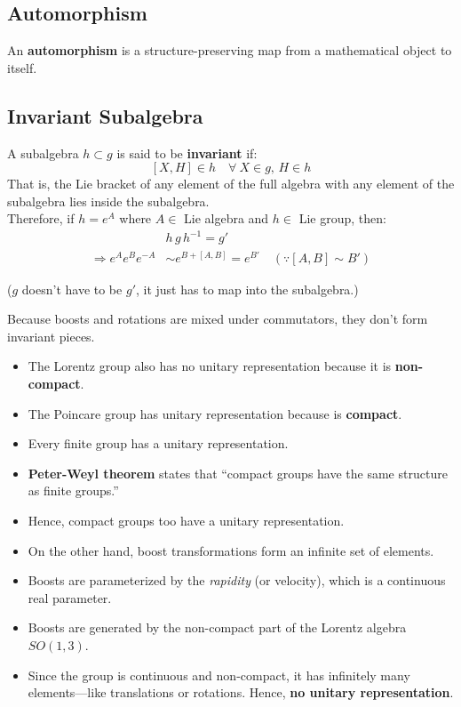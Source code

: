 \documentclass[14pt]{article} %
\begin{document}
\subsection*{Automorphism}
An \textbf{automorphism} is a structure-preserving map from a mathematical object to itself.

\subsection*{Invariant Subalgebra}
A subalgebra $h \subset g$ is said to be \textbf{invariant} if:
\[
[X,H] \in h \quad \forall~ X \in g, \, H \in h
\]
That is, the Lie bracket of any element of the full algebra with any element of the subalgebra lies inside the subalgebra.\\
Therefore, if $h = e^A$ where $A \in$ Lie algebra and $h \in$ Lie group, then:
\begin{align*}
&h\,g\,h^{-1} = g' \\
\Rightarrow e^A e^B e^{-A} &\sim e^{B+[A,B]} = e^{B'} \quad (\because [A,B] \sim B' )
\end{align*}
\begin{center}
    ($g$ doesn’t have to be $g'$, it just has to map into the subalgebra.)
\end{center}
Because boosts and rotations are mixed under commutators, they don’t form invariant pieces.
\begin{tcolorbox}[proofbox, title=Notes]
\begin{itemize}
    \item The Lorentz group also has no unitary representation because it is \textbf{non-compact}.
    \item The Poincare group has unitary representation because is \textbf{compact}.
    \item Every finite group has a unitary representation.
    \item \textbf{Peter-Weyl theorem} states that “compact groups have the same structure as finite groups.”
    \item Hence, compact groups too have a unitary representation.
    \item On the other hand, boost transformations form an infinite set of elements.
    \item Boosts are parameterized by the \textit{rapidity} (or velocity), which is a continuous real parameter.
    \item Boosts are generated by the non-compact part of the Lorentz algebra $SO(1,3)$.
    \item Since the group is continuous and non-compact, it has infinitely many elements—like translations or rotations. Hence, \textbf{no unitary representation}.
\end{itemize}
\end{tcolorbox}
\end{document}
